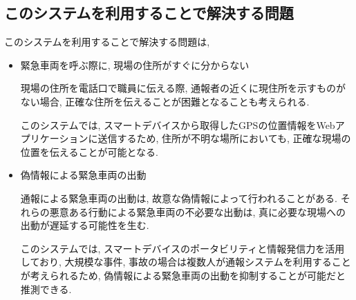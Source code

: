 \subsection{このシステムを利用することで解決する問題}
このシステムを利用することで解決する問題は,
\begin{itemize}
\item 緊急車両を呼ぶ際に, 現場の住所がすぐに分からない

現場の住所を電話口で職員に伝える際, 通報者の近くに現住所を示すものがない場合, 正確な住所を伝えることが困難となることも考えられる.

このシステムでは, スマートデバイスから取得したGPSの位置情報をWebアプリケーションに送信するため, 住所が不明な場所においても, 正確な現場の位置を伝えることが可能となる.

\item 偽情報による緊急車両の出動

通報による緊急車両の出動は, 故意な偽情報によって行われることがある.
それらの悪意ある行動による緊急車両の不必要な出動は, 真に必要な現場への出動が遅延する可能性を生む.

このシステムでは, スマートデバイスのポータビリティと情報発信力を活用しており, 大規模な事件, 事故の場合は複数人が通報システムを利用することが考えられるため, 偽情報による緊急車両の出動を抑制することが可能だと推測できる.
\end{itemize}

